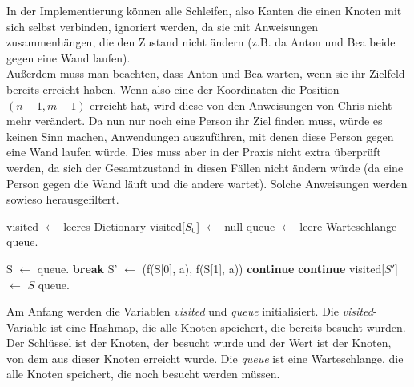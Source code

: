 \documentclass[a4paper,10pt,ngerman]{scrartcl}
\begin{document}
    In der Implementierung können alle Schleifen, also Kanten die einen Knoten mit sich selbst verbinden, ignoriert werden, da sie mit Anweisungen zusammenhängen, die den Zustand nicht ändern (z.B. da Anton und Bea beide gegen eine Wand laufen). \\
    Außerdem muss man beachten, dass Anton und Bea warten, wenn sie ihr Zielfeld bereits erreicht haben. Wenn also eine der Koordinaten die Position $(n-1,m-1)$ erreicht hat, wird diese von den Anweisungen von Chris nicht mehr verändert. Da nun nur noch eine Person ihr Ziel finden muss, würde es keinen Sinn machen, Anwendungen auszuführen, mit denen diese Person gegen eine Wand laufen würde. Dies muss aber in der Praxis nicht extra überprüft werden, da sich der Gesamtzustand in diesen Fällen nicht ändern würde (da eine Person gegen die Wand läuft und die andere wartet). Solche Anweisungen werden sowieso herausgefiltert.
    \begin{algorithm}[H]
        \begin{algorithmic}[1]
                \State visited $\gets$ leeres Dictionary
                \State visited[$S_0$] $\gets$ null
                \State queue $\gets$ leere Warteschlange
                \State queue.

                    \State S $\gets$ queue.
                        \State \textbf{break}
                    \EndIf
                        \State S' $\gets$ (f(S[0], a), f(S[1], a))
                            \State \textbf{continue}
                        \EndIf
                            \State \textbf{continue}
                        \EndIf
                        \State visited[$S'$] $\gets$ $S$
                        \State queue.
                    \EndFor
                \EndWhile
                    \State {}
                \Else
                    \State \Return {}
                \EndIf
            \EndFunction
        \end{algorithmic}\label{alg:bfs}
    \end{algorithm}
    Am Anfang werden die Variablen \textit{visited} und \textit{queue} initialisiert. Die \textit{visited}-Variable ist eine Hashmap, die alle Knoten speichert, die bereits besucht wurden. Der Schlüssel ist der Knoten, der besucht wurde und der Wert ist der Knoten, von dem aus dieser Knoten erreicht wurde. Die \textit{queue} ist eine Warteschlange, die alle Knoten speichert, die noch besucht werden müssen.\\
\end{document}

